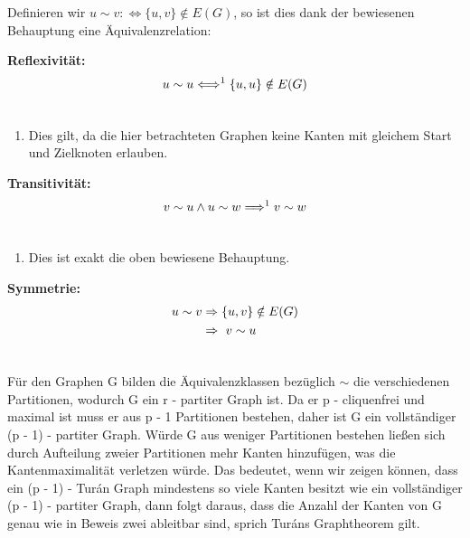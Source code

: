 \documentclass[12pt, a4paper]{article}
\begin{document}
Definieren wir $u \sim v :\Longleftrightarrow \{ u,v \} \notin E(G)$, so ist dies dank der bewiesenen Behauptung eine Äquivalenzrelation:

\textbf{Reflexivität:}
\begin{gather}
\begin{split}u \sim u \Longleftrightarrow^1 \{ u,u \} \notin E(G)\end{split}\notag\\\begin{split}\end{split}\notag
\end{gather}\begin{enumerate}
\item {}
Dies gilt, da die hier betrachteten Graphen keine Kanten mit gleichem Start und Zielknoten erlauben.

\end{enumerate}

\textbf{Transitivität:}
\begin{gather}
\begin{split} v \sim u \wedge u \sim w \Longrightarrow^1 v \sim w\end{split}\notag\\\begin{split}\end{split}\notag
\end{gather}\begin{enumerate}
\item {}
Dies ist exakt die oben bewiesene Behauptung.

\end{enumerate}

\textbf{Symmetrie:}
\begin{gather}
\begin{split}u \sim v &\Rightarrow \{ u,v \} \notin E(G) \\
&\Rightarrow\ v \sim u\end{split}\notag\\\begin{split}\end{split}\notag
\end{gather}

Für den Graphen G bilden die Äquivalenzklassen bezüglich $\sim$ die verschiedenen Partitionen, wodurch G ein r - partiter Graph ist. Da er p - cliquenfrei und maximal ist muss er aus p - 1 Partitionen bestehen, daher ist G ein vollständiger (p - 1) - partiter Graph. Würde G aus weniger Partitionen bestehen ließen sich durch Aufteilung zweier Partitionen mehr Kanten hinzufügen, was die Kantenmaximalität verletzen würde. Das bedeutet, wenn wir zeigen können, dass ein (p - 1) - Turán Graph mindestens so viele Kanten besitzt wie ein vollständiger (p - 1) - partiter Graph, dann folgt daraus, dass die Anzahl der Kanten von G genau wie in Beweis zwei ableitbar sind, sprich Turáns Graphtheorem gilt.
\end{document}
